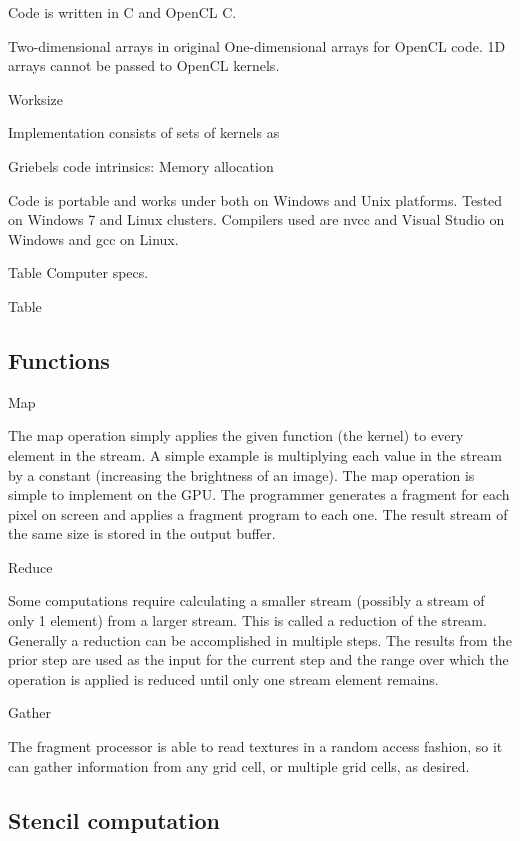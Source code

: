 Code is written in C and OpenCL C.

Two-dimensional arrays in original 
One-dimensional arrays for OpenCL code. 1D arrays cannot be passed to OpenCL kernels.

Worksize

Implementation consists of sets of kernels as 

Griebels code intrinsics: Memory allocation

Code is portable and works under both on Windows and Unix platforms. Tested on Windows 7 and Linux clusters. Compilers used are nvcc and Visual Studio on Windows and gcc on Linux.

Table Computer specs.


Table

\subsection{Functions}
Map

The map operation simply applies the given function (the kernel) to every element in the stream. A simple example is multiplying each value in the stream by a constant (increasing the brightness of an image). The map operation is simple to implement on the GPU. The programmer generates a fragment for each pixel on screen and applies a fragment program to each one. The result stream of the same size is stored in the output buffer.


Reduce

Some computations require calculating a smaller stream (possibly a stream of only 1 element) from a larger stream. This is called a reduction of the stream. Generally a reduction can be accomplished in multiple steps. The results from the prior step are used as the input for the current step and the range over which the operation is applied is reduced until only one stream element remains.

Gather

The fragment processor is able to read textures in a random access fashion, so it can gather information from any grid cell, or multiple grid cells, as desired.

\subsection{Stencil computation}


